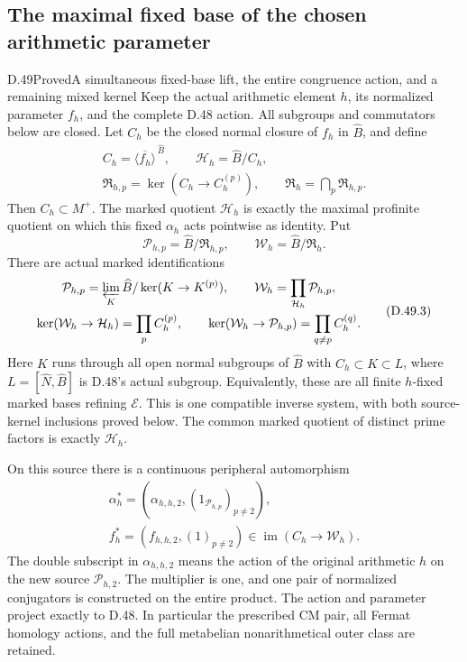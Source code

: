 \subsection{The maximal fixed base of the chosen arithmetic parameter}

\begin{statement}{D.49}{Proved}{A simultaneous fixed-base lift, the entire congruence action, and a remaining mixed kernel}
Keep the actual arithmetic element \(h\), its normalized parameter
\(f_h\), and the complete D.48 action. All subgroups and commutators
below are closed. Let \(C_h\) be the closed normal closure of
\(f_h\) in \(\widehat B\), and define
\[
 \begin{gathered}
 C_h=\overline{\langle f_h\rangle}^{\,\widehat B},\qquad
 \mathcal H_h=\widehat B/C_h,\\
 \mathfrak R_{h,p}=\ker(C_h\to C_h^{(p)}),\qquad
 \mathfrak R_h=\bigcap_p\mathfrak R_{h,p}.
 \end{gathered}
 \tag{D.49.1}
\]
Then \(C_h\subset M^+\). The marked quotient \(\mathcal H_h\)
is exactly the maximal profinite quotient on which this fixed
\(\alpha_h\) acts pointwise as identity. Put
\[
 \mathcal P_{h,p}=\widehat B/\mathfrak R_{h,p},\qquad
 \mathcal W_h=\widehat B/\mathfrak R_h.
 \tag{D.49.2}
\]
There are actual marked identifications
\[
 \begin{gathered}
 \mathcal P_{h,p}
   =\varprojlim_{K}\widehat B/\ker(K\to K^{(p)}),\qquad
 \mathcal W_h=\prod_{\mathcal H_h}\mathcal P_{h,p},\\
 \ker(\mathcal W_h\to\mathcal H_h)=\prod_pC_h^{(p)},\qquad
 \ker(\mathcal W_h\to\mathcal P_{h,p})
                       =\prod_{q\ne p}C_h^{(q)}.
 \end{gathered}
 \tag{D.49.3}
\]
Here \(K\) runs through all open normal subgroups of
\(\widehat B\) with \(C_h\subset K\subset L\), where
\(L=[\widehat N,\widehat B]\) is D.48's actual subgroup.
Equivalently, these are all finite \(h\)-fixed marked bases
refining \(\mathcal E\). This is one compatible inverse
system, with both source-kernel inclusions proved below.
The common marked quotient of distinct prime factors is
exactly \(\mathcal H_h\).

On this source there is a continuous peripheral automorphism
\[
 \begin{gathered}
 \alpha_h^*=(\alpha_{h,h,2},(1_{\mathcal P_{h,p}})_{p\ne2}),
 \\
 f_h^*=(f_{h,h,2},(1)_{p\ne2})
                  \in\operatorname{im}(C_h\to\mathcal W_h).
 \end{gathered}
 \tag{D.49.4}
\]
The double subscript in \(\alpha_{h,h,2}\) means the action
of the original arithmetic \(h\) on the new source
\(\mathcal P_{h,2}\). The multiplier is one, and one pair
of normalized conjugators is constructed on the entire
product. The action and parameter project exactly to D.48.
In particular the prescribed CM pair, all Fermat homology
actions, and the full metabelian nonarithmetical outer class
are retained.


\end{statement}
